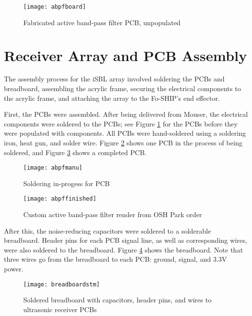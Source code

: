 \documentclass[12pt,a4paper]{report}
\begin{document}
\begin{figure}[htbp]
	\centering
	\texttt{[image: abpfboard]}
	\caption{Fabricated active band-pass filter PCB, unpopulated}
	\label{fig:abpfboard}
\end{figure}

\section{Receiver Array and PCB Assembly} \label{3s5}
The assembly process for the iSBL array involved soldering the PCBs and breadboard, assembling the acrylic frame, securing the electrical components to the acrylic frame, and attaching the array to the Fo-SHIP’s end effector.

First, the PCBs were assembled. After being delivered from Mouser, the electrical components were soldered to the PCBs; see Figure \ref{fig:abpfboard} for the PCBs before they were populated with components. All PCBs were hand-soldered using a soldering iron, heat gun, and solder wire. Figure \ref{fig:abpfmanu} shows one PCB in the process of being soldered, and Figure \ref{fig:abpffinished} shows a completed PCB. 

\begin{figure}[htbp]
	\centering
	\texttt{[image: abpfmanu]}
	\caption{Soldering in-progess for PCB}
	\label{fig:abpfmanu}
\end{figure}

\begin{figure}[htbp]
	\centering
	\texttt{[image: abpffinished]}
	\caption{Custom active band-pass filter render from OSH Park order}
	\label{fig:abpffinished}
\end{figure}

After this, the noise-reducing capacitors were soldered to a solderable breadboard. Header pins for each PCB signal line, as well as corresponding wires, were also soldered to the breadboard. Figure \ref{fig:breadboardstm} shows the breadboard. Note that three wires go from the breadboard to each PCB: ground, signal, and 3.3V power.

\begin{figure}[htbp]
	\centering
	\texttt{[image: breadboardstm]}
	\caption{Soldered breadboard with capacitors, header pins, and wires to ultrasonic receiver PCBs}
	\label{fig:breadboardstm}
\end{figure}

\pagebreak
\end{document}
